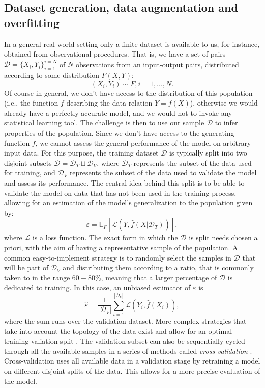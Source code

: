 \subsection{Dataset generation, data augmentation and overfitting}\label{sec: dataset}

In a general real-world setting only a finite dataset is available to us, for instance, obtained from observational procedures.
That is, we have a set of pairs $\mathcal{D}=\{X_i,Y_i \}_{i=1}^{i=N}$ of $N$ observations from an input-output pairs, distributed according to some distribution $F(X,Y)$:
\begin{equation}
    (X_i,Y_i) \sim F, i=1,...,N.
\end{equation}
Of course in general, we don't have access to the distribution of this population (i.e., the function $f$ describing the data relation $Y=f(X)$), otherwise we would already have a perfectly accurate model, and we would not to invoke any statistical learning tool.
The challenge is then to use our sample $\mathcal{D}$ to infer properties of the population.
Since we don't have access to the generating function $f$, we cannot assess the general performance of the model on arbitrary input data.
For this purpose, the training dataset $\mathcal{D}$ is typically split into two disjoint subsets $\mathcal{D}=\mathcal{D}_T \sqcup \mathcal{D}_V$, where $\mathcal{D}_T$ represents the subset of the data used for training, and $\mathcal{D}_V$ represents the subset of the data used to validate the model and assess its performance.
The central idea behind this split is to be able to validate the model on data that has not been used in the training process, allowing for an estimation of the model's generalization to the population given by:
\begin{equation}\label{eq_ch3:global_loss}
    \varepsilon =\mathbb{E}_F[\mathcal{L}(Y,\hat{f}(X|\mathcal{D}_T))],
\end{equation}
where $\mathcal{L}$ is a loss function.
The exact form in which the $\mathcal{D}$ is split needs chosen a priori, with the aim of having a representative sample of the population.
A common easy-to-implement strategy is to randomly select the samples in $\mathcal{D}$ that will be part of $\mathcal{D}_V$ and distributing them according to a ratio, that is commonly taken to in the range $60-80\%$, meaning that a larger percentage of $\mathcal{D}$ is dedicated to training.
In this case, an unbiased estimator of $\varepsilon$ is
\begin{equation}
    \hat{\varepsilon}=\frac{1}{|\mathcal{D}_V|}\sum_{i=1}^{|\mathcal{D}_V|}\mathcal{L}(Y_i,\hat{f}(X_i)),
\end{equation}
where the sum runs over the validation dataset.
More complex strategies that take into account the topology of the data exist and allow for an optimal training-valiation split \cite{data_split}. 
The validation subset can also be sequentially cycled through all the available samples in a series of methods called \emph{cross-validation} \cite{cross_validation}. Cross-validation uses all available data in a validation stage by retraining a model on different disjoint splits of the data. This allows for a more precise evaluation of the model.

